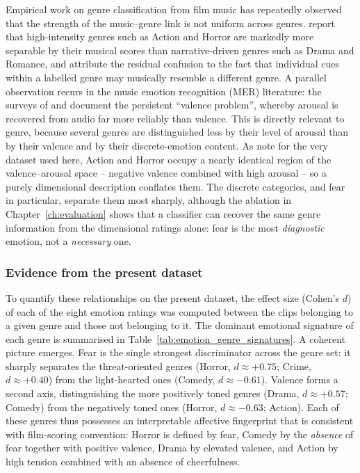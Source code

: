 Empirical work on genre classification from film music has repeatedly observed that the
strength of the music--genre link is not uniform across genres. \citet{austin2010characterization}
report that high-intensity genres such as Action and Horror are markedly more separable
by their musical scores than narrative-driven genres such as Drama and Romance, and
attribute the residual confusion to the fact that individual cues within a labelled genre
may musically resemble a different genre. A parallel observation recurs in the music
emotion recognition (MER) literature: the surveys of \citet{kim2010music} and
\citet{kang2025there} document the persistent ``valence problem'', whereby arousal is
recovered from audio far more reliably than valence. This is directly relevant to genre,
because several genres are distinguished less by their level of arousal than by their
valence and by their discrete-emotion content. As \citet{eerola2011comparison} note for
the very dataset used here, Action and Horror occupy a nearly identical region of the
valence--arousal space -- negative valence combined with high arousal -- so a purely
dimensional description conflates them. The discrete categories, and fear in particular,
separate them most sharply, although the ablation in Chapter~\ref{ch:evaluation}
shows that a classifier can recover the same genre information from the dimensional
ratings alone: fear is the most \emph{diagnostic} emotion, not a \emph{necessary} one.

\subsubsection*{Evidence from the present dataset}

To quantify these relationships on the present dataset, the effect size (Cohen's $d$) of
each of the eight emotion ratings was computed between the clips belonging to a given
genre and those not belonging to it. The dominant emotional signature of each genre is
summarised in Table~\ref{tab:emotion_genre_signatures}. A coherent picture emerges. Fear
is the single strongest discriminator across the genre set: it sharply separates the
threat-oriented genres (Horror, $d\approx+0.75$; Crime, $d\approx+0.40$) from the
light-hearted ones (Comedy, $d\approx-0.61$). Valence forms a second axis, distinguishing
the more positively toned genres (Drama, $d\approx+0.57$; Comedy) from the negatively
toned ones (Horror, $d\approx-0.63$; Action). Each of these genres thus possesses an
interpretable affective fingerprint that is consistent with film-scoring convention:
Horror is defined by fear, Comedy by the \emph{absence} of fear together with positive
valence, Drama by elevated valence, and Action by high tension combined with an absence
of cheerfulness.

